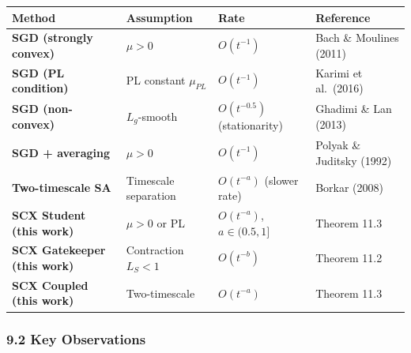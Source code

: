 \documentclass[
  12pt,
]{ctexart}
\begin{document}
\begin{longtable}[]{@{}
  >{\raggedright\arraybackslash}p{}
  >{\raggedright\arraybackslash}p{}
  >{\raggedright\arraybackslash}p{}
  >{\raggedright\arraybackslash}p{}@{}}
\toprule\noalign{}
\begin{minipage}[b]{\linewidth}\raggedright
Method
\end{minipage} & \begin{minipage}[b]{\linewidth}\raggedright
Assumption
\end{minipage} & \begin{minipage}[b]{\linewidth}\raggedright
Rate
\end{minipage} & \begin{minipage}[b]{\linewidth}\raggedright
Reference
\end{minipage} \\
\midrule\noalign{}
\endhead
\bottomrule\noalign{}
\endlastfoot
\textbf{SGD (strongly convex)} & \(\mu > 0\) & \(O(t^{-1})\) & Bach \&
Moulines (2011) \\
\textbf{SGD (PL condition)} & PL constant \(\mu_{PL}\) & \(O(t^{-1})\) &
Karimi et al.~(2016) \\
\textbf{SGD (non-convex)} & \(L_g\)-smooth & \(O(t^{-0.5})\)
(stationarity) & Ghadimi \& Lan (2013) \\
\textbf{SGD + averaging} & \(\mu > 0\) & \(O(t^{-1})\) & Polyak \&
Juditsky (1992) \\
\textbf{Two-timescale SA} & Timescale separation & \(O(t^{-a})\) (slower
rate) & Borkar (2008) \\
\textbf{SCX Student (this work)} & \(\mu > 0\) or PL & \(O(t^{-a})\),
\(a \in (0.5, 1]\) & Theorem 11.3 \\
\textbf{SCX Gatekeeper (this work)} & Contraction \(L_S < 1\) &
\(O(t^{-b})\) & Theorem 11.2 \\
\textbf{SCX Coupled (this work)} & Two-timescale & \(O(t^{-a})\) &
Theorem 11.3 \\
\end{longtable}

\subsubsection{9.2 Key Observations}\label{key-observations}
\end{document}
